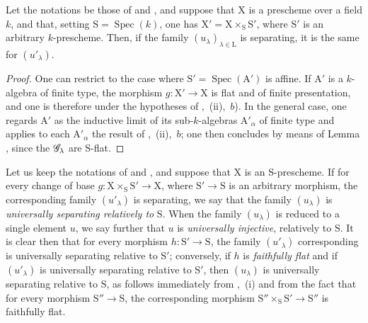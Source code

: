 \begin{proposition}[11.9.13]
\label{IV.11.9.13}
Let the notations be those of  and , and suppose that $\mathrm{X}$ is a prescheme over a field $k$, and that, setting $\mathrm{S}=\operatorname{Spec}(k)$, one has $\mathrm{X}'=\mathrm{X}\times_\mathrm{S}\mathrm{S}'$, where $\mathrm{S}'$ is an arbitrary $k$-prescheme.
Then, if the family $(u_\lambda)_{\lambda\in\mathrm{L}}$ is separating, it is the same for $(u'_\lambda)$.
\end{proposition}

\begin{proof}
One can restrict to the case where $\mathrm{S}'=\operatorname{Spec}(\mathrm{A}')$ is affine.
If $\mathrm{A}'$ is a $k$-algebra of finite type, the morphism $g:\mathrm{X}'\to\mathrm{X}$ is flat and of finite presentation, and one is therefore under the hypotheses of ,~(ii),~$b$).
In the general case, one regards $\mathrm{A}'$ as the inductive limit of its sub-$k$-algebras $\mathrm{A}'_\alpha$ of finite type and applies to each $\mathrm{A}'_\alpha$ the result of ,~(ii),~$b$; one then concludes by means of Lemma , since the $\mathscr{G}_\lambda$ are $\mathrm{S}$-flat.
\end{proof}

\begin{env}[11.9.14]
\label{IV.11.9.14}
Let us keep the notations of  and , and suppose that $\mathrm{X}$ is an $\mathrm{S}$-prescheme.
If for every change of base $g:\mathrm{X}\times_\mathrm{S}\mathrm{S}'\to\mathrm{X}$, where $\mathrm{S}'\to\mathrm{S}$ is an arbitrary morphism, the corresponding family $(u'_\lambda)$ is separating, we say that the family $(u_\lambda)$ is \emph{universally separating relatively to} $\mathrm{S}$.
When the family $(u_\lambda)$ is reduced to a single element $u$, we say further that $u$ is \emph{universally injective}, relatively to $\mathrm{S}$.
It is clear then that for every morphism $h:\mathrm{S}'\to\mathrm{S}$, the family $(u'_\lambda)$ corresponding is universally separating relative to $\mathrm{S}'$; conversely, if $h$ is \emph{faithfully flat} and if $(u'_\lambda)$ is universally separating relative to $\mathrm{S}'$, then $(u_\lambda)$ is universally separating relative to $\mathrm{S}$, as follows immediately from ,~(i) and from the fact that for every morphism $\mathrm{S}''\to\mathrm{S}$, the corresponding morphism $\mathrm{S}''\times_\mathrm{S}\mathrm{S}'\to\mathrm{S}''$ is faithfully flat.
\end{env}


